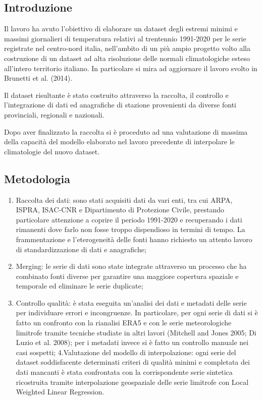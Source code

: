 \documentclass[
]{article}
\author{Davide Nicoli}
\date{2025-03-24}
\providecommand{\tightlist}{%
  \setlength{\itemsep}{0pt}\setlength{\parskip}{0pt}}
\begin{document}
\subsection{Introduzione}\label{introduzione}

Il lavoro ha avuto l'obiettivo di elaborare un dataset degli estremi
minimi e massimi giornalieri di temperatura relativi al trentennio
1991-2020 per le serie registrate nel centro-nord italia, nell'ambito di
un più ampio progetto volto alla costruzione di un dataset ad alta
risoluzione delle normali climatologiche esteso all'intero territorio
italiano. In particolare si mira ad aggiornare il lavoro svolto in
Brunetti et al. (2014).

Il dataset risultante è stato costruito attraverso la raccolta, il
controllo e l'integrazione di dati ed anagrafiche di stazione
provenienti da diverse fonti provinciali, regionali e nazionali.

Dopo aver finalizzato la raccolta si è proceduto ad una valutazione di
massima della capacità del modello elaborato nel lavoro precedente di
interpolare le climatologie del nuovo dataset.

\subsection{Metodologia}\label{metodologia}

\begin{enumerate}
\def\labelenumi{\arabic{enumi}.}
\tightlist
\item
  Raccolta dei dati: sono stati acquisiti dati da vari enti, tra cui
  ARPA, ISPRA, ISAC-CNR e Dipartimento di Protezione Civile, prestando
  particolare attenzione a coprire il periodo 1991-2020 e recuperando i
  dati rimanenti dove farlo non fosse troppo dispendioso in termini di
  tempo. La frammentazione e l'eterogeneità delle fonti hanno richiesto
  un attento lavoro di standardizzazione di dati e anagrafiche;
\item
  Merging: le serie di dati sono state integrate attraverso un processo
  che ha combinato fonti diverse per garantire una maggiore copertura
  spaziale e temporale ed eliminare le serie duplicate;
\item
  Controllo qualità: è stata eseguita un'analisi dei dati e metadati
  delle serie per individuare errori e incongruenze. In particolare, per
  ogni serie di dati si è fatto un confronto con la rianalisi ERA5 e con
  le serie meteorologiche limitrofe tramite tecniche studiate in altri
  lavori (Mitchell and Jones 2005; Di Luzio et al. 2008); per i metadati
  invece si è fatto un controllo manuale nei casi sospetti;
  4.Valutazione del modello di interpolazione: ogni serie del dataset
  soddisfacente determinati criteri di qualità minimi e completata dei
  dati mancanti è stata confrontata con la corrispondente serie
  sintetica ricostruita tramite interpolazione geospaziale delle serie
  limitrofe con Local Weighted Linear Regression.
\end{enumerate}
\end{document}
